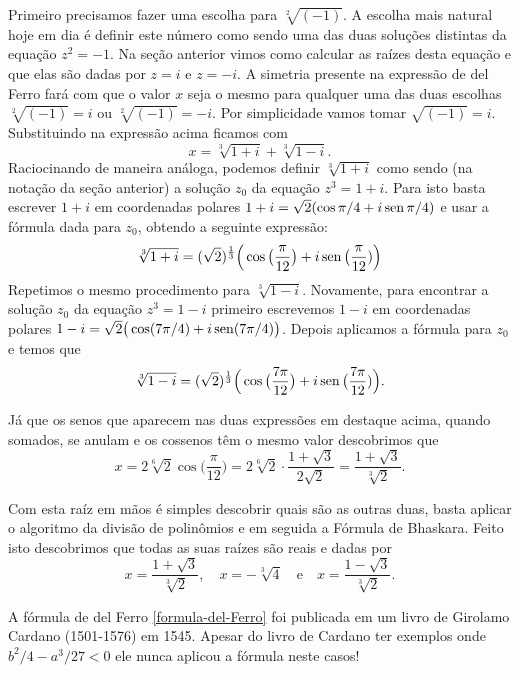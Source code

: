 \begin{subappendices}
Primeiro precisamos fazer uma escolha para $\sqrt[2]{(-1)}$. A escolha mais 
natural hoje em dia é definir este número como sendo uma das duas soluções distintas da equação $z^2=-1$. 
Na seção anterior vimos como calcular as raízes desta equação e que elas são dadas por 
$z=i$ e $z=-i$.
A simetria presente na expressão de del Ferro fará com que o valor $x$ seja o mesmo para qualquer uma 
das duas escolhas $\sqrt[2]{(-1)}=i$ 
ou $\sqrt[2]{(-1)}=-i$.
Por simplicidade vamos tomar $\sqrt{(-1)}=i$. Substituindo na expressão acima 
ficamos com 
\[
x =
\sqrt[3]{1+i}
+
\sqrt[3]{1-i}.
\]
Raciocinando de maneira análoga, podemos definir $\sqrt[3]{1+i}$ 
como sendo (na notação da seção anterior) a solução $z_0$ da equação $z^3=1+i$. 
Para isto basta escrever $1+i$ em coordenadas polares $1+i = \sqrt{2}(\cos\pi/4+i\operatorname{sen}\pi/4)$
e usar a fórmula dada para $z_0$, obtendo a seguinte expressão:
\[
\sqrt[3]{1+i} = (\sqrt{2})^{\frac{1}{3}}\Big(\cos\big(\frac{\pi}{12}\big)+i\operatorname{sen}\big(\frac{\pi}{12})\Big)
\]
Repetimos o mesmo procedimento para $\sqrt[3]{1-i}$. 
Novamente, para encontrar a solução $z_0$ da equação $z^3=1-i$ primeiro escrevemos $1-i$ em coordenadas polares
$1-i = \sqrt{2}\big(\cos(7\pi/4) +i\operatorname{sen}(7\pi/4)\big)$. Depois aplicamos a fórmula para $z_0$ e temos
que 
\[
\sqrt[3]{1-i} = (\sqrt{2})^{\frac{1}{3}}\Big(\cos\big(\frac{7\pi}{12}\big)+i\operatorname{sen}\big(\frac{7\pi}{12})\Big).
\]

Já que os senos que aparecem nas duas expressões em destaque acima, quando somados, 
se anulam e os cossenos têm o mesmo valor descobrimos que 
\[
x= 
2\sqrt[6]{2}\cos\big(\frac{\pi}{12}\big) 
= 
2\sqrt[6]{2}\cdot \frac{1+\sqrt{3}}{2\sqrt{2}}
=
\frac{1+\sqrt{3}}{\sqrt[3]{2}}.
\]

Com esta raíz em mãos é simples descobrir quais são as outras duas, basta 
aplicar o algoritmo da divisão de polinômios e em seguida a Fórmula de Bhaskara. 
Feito isto descobrimos que todas as suas raízes são reais e dadas por
\[
x= \frac{1+\sqrt{3}}{\sqrt[3]{2}},\quad 
x= -\sqrt[3]{4} \quad \text{e}\quad x= \frac{1-\sqrt{3}}{\sqrt[3]{2}}.
\]

A fórmula de del Ferro \eqref{formula-del-Ferro} foi publicada em um livro de Girolamo Cardano (1501-1576) em 1545.
Apesar do livro de Cardano ter exemplos onde $b^2/4-a^3/27<0$ ele nunca aplicou 
a fórmula neste casos!



\end{subappendices}
